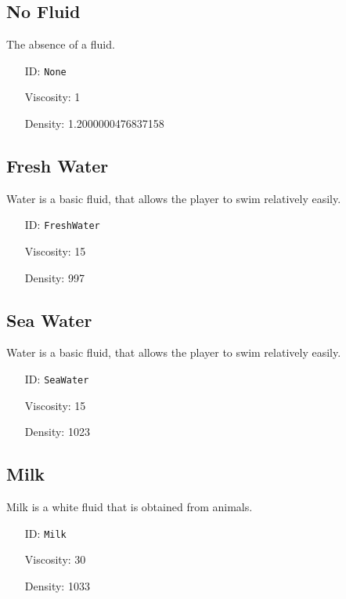 \subsection{No Fluid}\label{subsec:fluids_no fluid}
The absence of a fluid.
\newline
\begin{itemize}[nosep]
\item[ID:] \texttt{None}
\item[Viscosity:] 1
\item[Density:] 1.2000000476837158
\end{itemize}

\subsection{Fresh Water}\label{subsec:fluids_fresh water}
Water is a basic fluid, that allows the player to swim relatively easily.
\newline
\begin{itemize}[nosep]
\item[ID:] \texttt{FreshWater}
\item[Viscosity:] 15
\item[Density:] 997
\end{itemize}

\subsection{Sea Water}\label{subsec:fluids_sea water}
Water is a basic fluid, that allows the player to swim relatively easily.
\newline
\begin{itemize}[nosep]
\item[ID:] \texttt{SeaWater}
\item[Viscosity:] 15
\item[Density:] 1023
\end{itemize}

\subsection{Milk}\label{subsec:fluids_milk}
Milk is a white fluid that is obtained from animals.
\newline
\begin{itemize}[nosep]
\item[ID:] \texttt{Milk}
\item[Viscosity:] 30
\item[Density:] 1033
\end{itemize}

